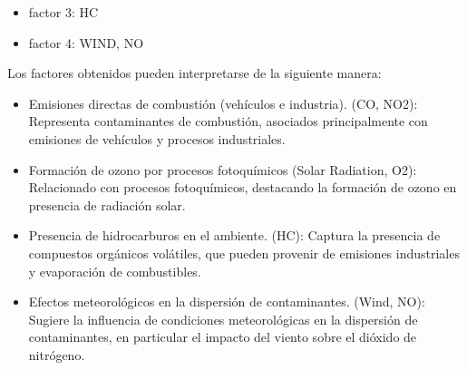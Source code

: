 \begin{sol}
\begin{itemize}
\item factor 3: HC
\item factor 4: WIND, NO
\end{itemize}
Los factores obtenidos pueden interpretarse de la siguiente manera:
\begin{itemize}
\item Emisiones directas de combustión (vehículos e industria). (CO, NO2): Representa contaminantes de combustión, asociados principalmente con emisiones de vehículos y procesos industriales.
\item Formación de ozono por procesos fotoquímicos  (Solar Radiation, O2): Relacionado con procesos fotoquímicos, destacando la formación de ozono en presencia de radiación solar.
\item Presencia de hidrocarburos en el ambiente. (HC): Captura la presencia de compuestos orgánicos volátiles, que pueden provenir de emisiones industriales y evaporación de combustibles.
\item Efectos meteorológicos en la dispersión de contaminantes. (Wind, NO): Sugiere la influencia de condiciones meteorológicas en la dispersión de contaminantes, en particular el impacto del viento sobre el dióxido de nitrógeno.

\end{itemize}
\end{sol}